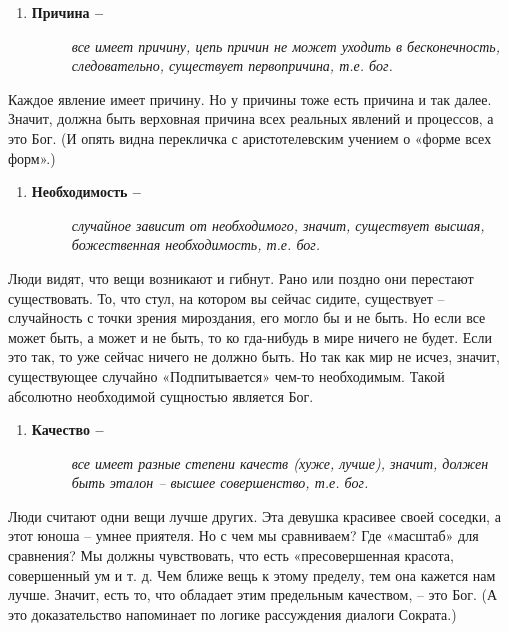\begin{enumerate}
\def\labelenumi{\arabic{enumi}.}
\setcounter{enumi}{1}
\item
  \begin{description}
  \item[\textbf{Причина --}]
  \emph{все имеет причину, цепь причин не может уходить в бесконечность,
  следовательно, существует первопричина, т.е. бог.}
  \end{description}
\end{enumerate}

Каждое явление имеет причину. Но у причины тоже есть причина и так
далее. Значит, должна быть верховная причина всех реальных явлений и
процессов, а это Бог. (И опять видна перекличка с аристотелевским
учением о «форме всех форм».)

\begin{enumerate}
\def\labelenumi{\arabic{enumi}.}
\setcounter{enumi}{2}
\item
  \begin{description}
  \item[\textbf{Необходимость --}]
  \emph{случайное зависит от необходимого, значит, существует высшая,
  божественная необходимость, т.е. бог.}
  \end{description}
\end{enumerate}

Люди видят, что вещи возникают и гибнут. Рано или поздно они перестают
существовать. То, что стул, на котором вы сейчас сидите, существует --
случайность с точки зрения мироздания, его могло бы и не быть. Но если
все может быть, а может и не быть, то ко­ гда-нибудь в мире ничего не
будет. Если это так, то уже сейчас ничего не должно быть. Но так как мир
не исчез, значит, существующее случайно «Подпитывается» чем-то
необходимым. Такой абсолютно необходимой сущностью является Бог.

\begin{enumerate}
\def\labelenumi{\arabic{enumi}.}
\setcounter{enumi}{3}
\item
  \begin{description}
  \item[\textbf{Качество --}]
  \emph{все имеет разные степени качеств (хуже, лучше), значит, должен
  быть эталон -- высшее совершенство, т.е. бог.}
  \end{description}
\end{enumerate}

Люди считают одни вещи лучше других. Эта девушка красивее своей соседки,
а этот юноша -- умнее приятеля. Но с чем мы сравниваем? Где «масштаб»
для сравнения? Мы должны чувствовать, что есть «пресовершенная красота,
совершенный ум и т. д. Чем ближе вещь к этому пределу, тем она кажется
нам лучше. Значит, есть то, что обладает этим предельным качеством, --
это Бог. (А это доказательство напоминает по логике рассуждения диалоги
Сократа.)

